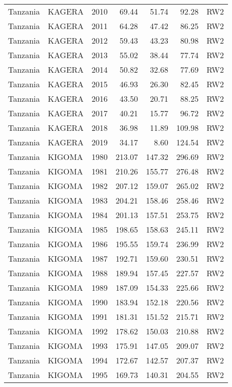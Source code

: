 \begin{longtable}{lllrrrl}
  Tanzania & KAGERA & 2010 & 69.44 & 51.74 & 92.28 & RW2 \\ 
  Tanzania & KAGERA & 2011 & 64.28 & 47.42 & 86.25 & RW2 \\ 
  Tanzania & KAGERA & 2012 & 59.43 & 43.23 & 80.98 & RW2 \\ 
  Tanzania & KAGERA & 2013 & 55.02 & 38.44 & 77.74 & RW2 \\ 
  Tanzania & KAGERA & 2014 & 50.82 & 32.68 & 77.69 & RW2 \\ 
  Tanzania & KAGERA & 2015 & 46.93 & 26.30 & 82.45 & RW2 \\ 
  Tanzania & KAGERA & 2016 & 43.50 & 20.71 & 88.25 & RW2 \\ 
  Tanzania & KAGERA & 2017 & 40.21 & 15.77 & 96.72 & RW2 \\ 
  Tanzania & KAGERA & 2018 & 36.98 & 11.89 & 109.98 & RW2 \\ 
  Tanzania & KAGERA & 2019 & 34.17 & 8.60 & 124.54 & RW2 \\ 
  Tanzania & KIGOMA & 1980 & 213.07 & 147.32 & 296.69 & RW2 \\ 
  Tanzania & KIGOMA & 1981 & 210.26 & 155.77 & 276.48 & RW2 \\ 
  Tanzania & KIGOMA & 1982 & 207.12 & 159.07 & 265.02 & RW2 \\ 
  Tanzania & KIGOMA & 1983 & 204.21 & 158.46 & 258.46 & RW2 \\ 
  Tanzania & KIGOMA & 1984 & 201.13 & 157.51 & 253.75 & RW2 \\ 
  Tanzania & KIGOMA & 1985 & 198.65 & 158.63 & 245.11 & RW2 \\ 
  Tanzania & KIGOMA & 1986 & 195.55 & 159.74 & 236.99 & RW2 \\ 
  Tanzania & KIGOMA & 1987 & 192.71 & 159.60 & 230.51 & RW2 \\ 
  Tanzania & KIGOMA & 1988 & 189.94 & 157.45 & 227.57 & RW2 \\ 
  Tanzania & KIGOMA & 1989 & 187.09 & 154.33 & 225.66 & RW2 \\ 
  Tanzania & KIGOMA & 1990 & 183.94 & 152.18 & 220.56 & RW2 \\ 
  Tanzania & KIGOMA & 1991 & 181.31 & 151.52 & 215.71 & RW2 \\ 
  Tanzania & KIGOMA & 1992 & 178.62 & 150.03 & 210.88 & RW2 \\ 
  Tanzania & KIGOMA & 1993 & 175.91 & 147.05 & 209.07 & RW2 \\ 
  Tanzania & KIGOMA & 1994 & 172.67 & 142.57 & 207.37 & RW2 \\ 
  Tanzania & KIGOMA & 1995 & 169.73 & 140.31 & 204.55 & RW2 \\ 

\end{longtable}
